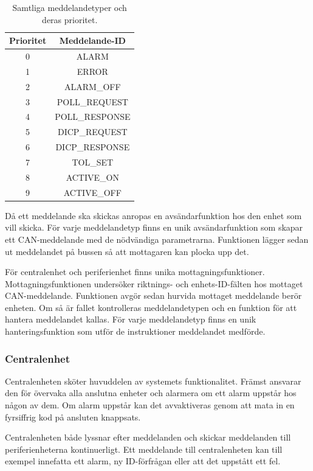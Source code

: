\documentclass[a4paper]{article}
\begin{document}
\begin{table}[H]
    \centering
    \caption{Samtliga meddelandetyper och deras prioritet.}
    \label{tab:meddelandetyper}
    \begin{tabular}{|c|c|}\hline
      Prioritet & Meddelande-ID \\\hline
      0 & ALARM \\\hline
      1 & ERROR \\\hline
      2 & ALARM\_OFF \\\hline
      3 & POLL\_REQUEST \\\hline
      4 & POLL\_RESPONSE \\\hline
      5 & DICP\_REQUEST \\\hline
      6 & DICP\_RESPONSE \\\hline
      7 & TOL\_SET \\\hline
      8 & ACTIVE\_ON \\\hline
      9 & ACTIVE\_OFF \\\hline
    \end{tabular}
  \end{table}

Då ett meddelande ska skickas anropas en avsändarfunktion hos den enhet som vill skicka.
För varje meddelandetyp finns en unik avsändarfunktion som skapar ett CAN-meddelande med de nödvändiga parametrarna.
Funktionen lägger sedan ut meddelandet på bussen så att mottagaren kan plocka upp det.

För centralenhet och periferienhet finns unika mottagningsfunktioner.
Mottagningsfunktionen undersöker riktnings- och enhets-ID-fälten hos mottaget CAN-meddelande.
Funktionen avgör sedan hurvida mottaget meddelande berör enheten.
Om så är fallet kontrolleras meddelandetypen och en funktion för att hantera meddelandet kallas.
För varje meddelandetyp finns en unik hanteringsfunktion som utför de instruktioner meddelandet medförde.

\subsubsection{Centralenhet}
Centralenheten sköter huvuddelen av systemets funktionalitet.
Främst ansvarar den för övervaka alla anslutna enheter och alarmera om ett alarm uppstår hos någon av dem.
Om alarm uppstår kan det avvaktiveras genom att mata in en fyrsiffrig kod på ansluten knappsats.

Centralenheten både lyssnar efter meddelanden och skickar meddelanden till periferienheterna kontinuerligt.
Ett meddelande till centralenheten kan till exempel innefatta ett alarm, ny ID-förfrågan eller att det uppstått ett fel.
\end{document}
